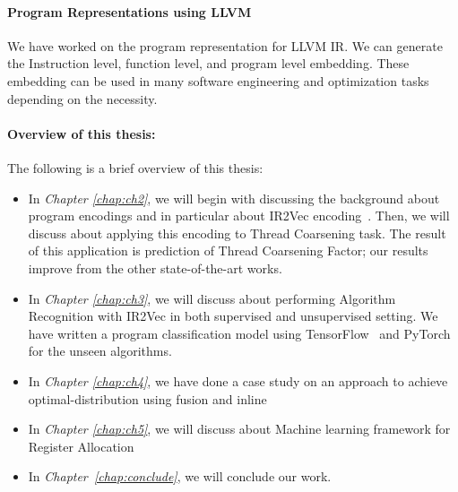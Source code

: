 \paragraph{Program Representations using LLVM}
We have worked on the program representation for LLVM IR. We can generate the Instruction level, function level, and program level embedding. These embedding can be used in many software engineering and optimization tasks depending on the necessity.


    	


\paragraph{Overview of this thesis:}
The following is a brief overview of this thesis:

\begin{itemize}
    \item In \textit{Chapter \ref{chap:ch2}}, we will begin with discussing the background about program encodings and in particular about IR2Vec encoding~\cite{IR2Vec}. 
    Then, we will discuss about applying this encoding to Thread Coarsening task. The result of this application is prediction of Thread Coarsening Factor; our results improve from the other state-of-the-art works.
    
    \item In \textit{Chapter \ref{chap:ch3}}, we will discuss about performing Algorithm Recognition with IR2Vec in both supervised and unsupervised setting.
    We have written a program classification model using TensorFlow~\cite{tensorflow_USENIX2016} and PyTorch~\cite{pytorch} for the unseen algorithms.	

    \item In \textit{Chapter \ref{chap:ch4}}, we have done a case study on an approach to achieve optimal-distribution using fusion and inline
    
    \item In \textit{Chapter \ref{chap:ch5}}, we will discuss about Machine learning framework for Register Allocation 
    
    \item  In \textit{Chapter~\ref{chap:conclude}}, we will conclude our work.
    
    
    

\end{itemize}